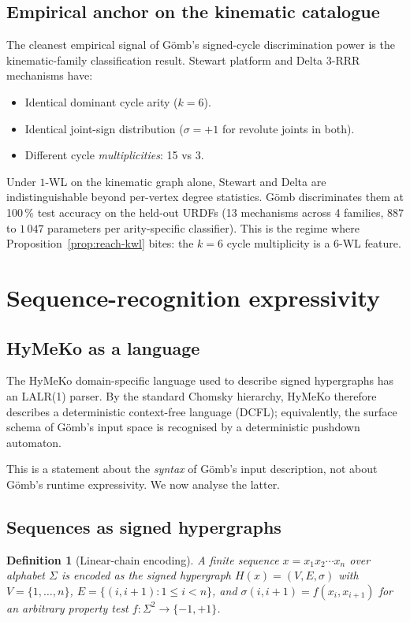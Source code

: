 \documentclass[11pt,a4paper]{article}
\newtheorem{definition}[theorem]{Definition}
\newcommand{\sig}{\ensuremath{\sigma}}
\newcommand{\WL}{\textsf{WL}}
\newcommand{\Gomb}{G\"omb}
\begin{document}
\subsection{Empirical anchor on the kinematic catalogue}

The cleanest empirical signal of \Gomb's signed-cycle discrimination
power is the kinematic-family classification result. Stewart
platform and Delta 3-RRR mechanisms have:
\begin{itemize}
\item Identical dominant cycle arity ($k = 6$).
\item Identical joint-sign distribution ($\sig = +1$ for revolute
  joints in both).
\item Different cycle \emph{multiplicities}: 15 vs 3.
\end{itemize}
Under $1$-\WL{} on the kinematic graph alone, Stewart and Delta
are indistinguishable beyond per-vertex degree statistics. \Gomb{}
discriminates them at 100\,\% test accuracy on the held-out URDFs
(13 mechanisms across 4 families, $887$ to $1\,047$ parameters per
arity-specific classifier). This is the regime where
Proposition~\ref{prop:reach-kwl} bites: the $k = 6$ cycle
multiplicity is a $6$-\WL{} feature.

\section{Sequence-recognition expressivity}

\subsection{HyMeKo as a language}

The HyMeKo domain-specific language used to describe signed
hypergraphs has an LALR(1) parser. By the standard Chomsky
hierarchy, HyMeKo therefore describes a deterministic context-free
language (DCFL); equivalently, the surface schema of \Gomb's
input space is recognised by a deterministic pushdown automaton.

This is a statement about the \emph{syntax} of \Gomb's input
description, not about \Gomb's runtime expressivity. We now
analyse the latter.

\subsection{Sequences as signed hypergraphs}

\begin{definition}[Linear-chain encoding]
A finite sequence $x = x_1 x_2 \cdots x_n$ over alphabet $\Sigma$
is encoded as the signed hypergraph
$H(x) = (V, E, \sig)$ with $V = \{1, \ldots, n\}$,
$E = \{(i, i{+}1) : 1 \leq i < n\}$, and
$\sig(i, i{+}1) = f(x_i, x_{i+1})$
for an arbitrary property test $f: \Sigma^2 \to \{-1, +1\}$.
\end{definition}
\end{document}
